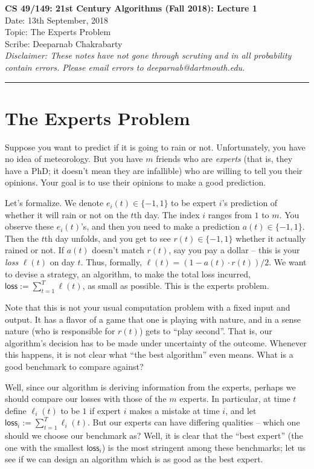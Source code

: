 \documentclass[11pt]{article}
\begin{document}
	\begin{center}
		{\bf \Large CS 49/149: 21st Century Algorithms (Fall 2018): Lecture 1}\\ 
		Date: 13th September, 2018 \\
		Topic: The Experts Problem \\
		Scribe: Deeparnab Chakrabarty \\
		{\em Disclaimer: These notes have not gone through scrutiny and in all probability contain errors. Please email errors to deeparnab@dartmouth.edu.}
	\end{center}
\hrule height 2pt
\vspace{3ex}
\def\loss{\mathsf{loss}}
\section{The Experts Problem}

Suppose you want to predict if it is going to rain or not. Unfortunately, you have no idea of meteorology. But you have $m$ friends who are {\em experts} (that is, they have a PhD; it doesn't mean they are infallible) who are willing to tell you their opinions. Your goal is to use their opinions to make a good prediction.

Let's formalize. We denote $e_i(t) \in \{-1,1\}$ to be expert $i$'s prediction of whether it will rain or not on the $t$th day. The index $i$ ranges from $1$ to $m$.
You observe these $e_i(t)$'s, and then you need to make a prediction $a(t) \in \{-1,1\}$. Then the $t$th day unfolds, and you get to see $r(t) \in \{-1,1\}$ whether it actually rained or not.
If $a(t)$ doesn't match $r(t)$, say you pay a dollar -- this is your {\em loss} $\ell(t)$ on day $t$. Thus, formally, $\ell(t) = (1 - a(t)\cdot r(t))/2$. We want to devise a strategy, an algorithm, to make the total loss incurred, $\loss := \sum_{t=1}^T \ell(t)$, as small as possible. This is the experts problem. \smallskip

Note that this is not your usual computation problem with a fixed input and output. It has a flavor of a game that one is playing with nature, and in a sense nature (who is responsible for $r(t)$) gets to ``play second''. That is, our algorithm's decision has to be made under uncertainty of the outcome. Whenever this happens, it is not clear what ``the best algorithm'' even means.
What is a good benchmark to compare against?


Well, since our algorithm is deriving information from the experts, perhaps we should compare our losses with those of the $m$ experts. In particular, at time $t$ define $\ell_i(t)$ to be $1$ if expert $i$ makes a mistake at time $i$, and let $\loss_i := \sum_{t=1}^T \ell_i(t)$.
But our experts can have differing qualities -- which one should we choose our benchmark as? Well, it is clear that the ``best expert'' (the one with the smallest $\loss_i$) is the most stringent among these benchmarks; let us see if we can design an algorithm which is as good as the best expert. 
\end{document}
